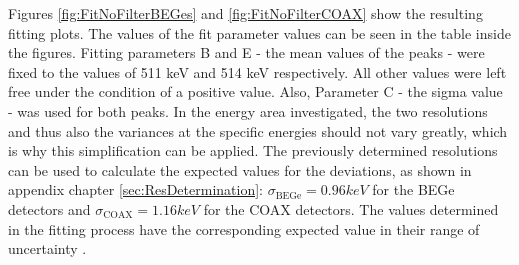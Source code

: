 \documentclass[encoding=utf8,british]{tumphthesis}
\begin{document}
Figures \ref{fig:FitNoFilterBEGes} and \ref{fig:FitNoFilterCOAX} show the resulting fitting plots.
The values of the fit parameter values can be seen in the table inside the figures.
Fitting parameters B and E - the mean values of the peaks - were fixed to the values of 511 keV and 514 keV respectively.
All other values were left free under the condition of a positive value.
Also, Parameter C - the sigma value - was used for both peaks.
In the energy area investigated, the two resolutions and thus also the variances at the specific energies should not vary greatly, which is why this simplification can be applied.
The previously determined resolutions can be used to calculate the expected values for the deviations, as shown in appendix chapter \ref{sec:ResDetermination}: $\sigma_{\mathrm{BEGe}} = 0.96 \unit{keV}$ for the BEGe detectors and $\sigma_{\mathrm{COAX}} = 1.16 \unit{keV}$ for the COAX detectors.
The values determined in the fitting process have the corresponding expected value in their range of uncertainty .
\\
\end{document}
